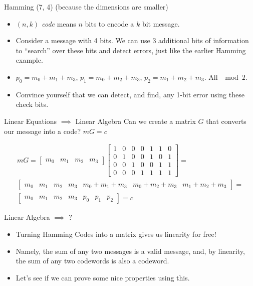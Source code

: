 \documentclass[aspectratio=169]{beamer}
\begin{document}
\begin{frame}{Hamming (7, 4) (because the dimensions are smaller)}
    \begin{itemize}
        \item \emph{$(n, k)$ code} means $n$ bits to encode a $k$ bit message. \pause 
        \item Consider a message with 4 bits. We can use 3 additional bits of information to ``search'' over these bits and detect errors, just like the earlier Hamming example. \pause 
        \item $p_0 = m_0 + m_1 + m_3$, $p_1 = m_0 + m_2 + m_3$, $p_2 = m_1 + m_2 + m_3$. All $\mod 2$.
        \item  Convince yourself that we can detect, and find, any 1-bit error using these check bits. 
    \end{itemize}
\end{frame}

\begin{frame}{Linear Equations $\implies$ Linear Algebra}
    Can we create a matrix $G$ that converts our message into a code? $mG = c$ \pause

 \begin{gather*}
 mG = \begin{bmatrix}
        m_0 & m_1 & m_2 & m_3
  \end{bmatrix} \begin{bmatrix}
      1 & 0 & 0 & 0 & 1 & 1 & 0 \\
      0 & 1 & 0 & 0 & 1 & 0 & 1 \\
      0 & 0 & 1 & 0 & 0 & 1 & 1 \\
      0 & 0 & 0 & 1 & 1 & 1 & 1
  \end{bmatrix} = \\ 
  \begin{bmatrix}
      m_0 & m_1 & m_2 & m_3 & m_0 + m_1 + m_3 & m_0 + m_2 + m_3 & m_1 + m_2 + m_3
  \end{bmatrix} = \\
  \begin{bmatrix}
      m_0 & m_1 & m_2 & m_3 & p_0 & p_1 & p_2
  \end{bmatrix} = c
  \end{gather*}
\end{frame}

\begin{frame}{Linear Algebra $\implies$ ?}
    \begin{itemize}
        \item Turning Hamming Codes into a matrix gives us linearity for free! \pause
        \item Namely, the sum of any two messages is a valid message, and, by linearity, the sum of any two codewords is also a codeword. \pause 
        \item Let's see if we can prove some nice properties using this. 
    \end{itemize}
\end{frame}
\end{document}
